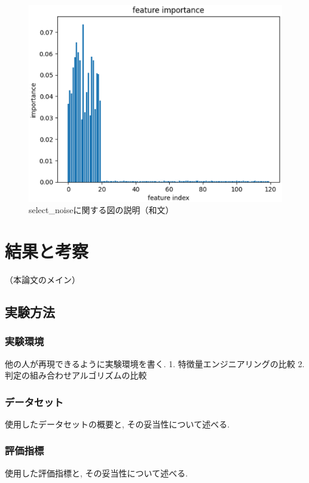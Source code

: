 \documentclass{css}
\begin{document}
\begin{figure}[tb]
    \centering
    \includegraphics[width=\linewidth]{pictures/eps/select_noise.eps}
    \caption{select\_noiseに関する図の説明（和文）}
    \label{fig:select_noise}
\end{figure}

\section{結果と考察}
（本論文のメイン）

\subsection{実験方法}

\subsubsection{実験環境}
他の人が再現できるように実験環境を書く.
1. 特徴量エンジニアリングの比較
2. 判定の組み合わせアルゴリズムの比較

\subsubsection{データセット}
使用したデータセットの概要と, その妥当性について述べる.

\subsubsection{評価指標}
使用した評価指標と, その妥当性について述べる.
\end{document}
